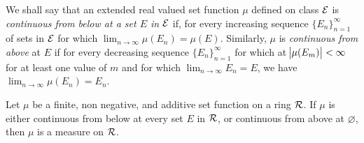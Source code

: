 We shall say that an extended real valued set function $\mu$ defined on 
class $\mathcal{E}$ is \emph{continuous from below at a set $E$ in $\mathcal{E}$} if, for 
every increasing sequence $\{E_n\}_{n=1}^\infty$ of sets in $\mathcal{E}$ for which 
$\lim_{n \to \infty} \mu(E_n) = \mu(E)$. 
Similarly, $\mu$ is \emph{continuous from above} at $E$ if for every 
decreasing sequence $\{E_n\}_{n=1}^\infty$ for which at $\abs{\mu(E_m)} < 
\infty$ for at least one value of $m$ and for which $\lim_{n \to \infty} 
E_n = E$, we have $\lim_{n \to \infty} \mu(E_n) = E_n$. 

\begin{thm}
Let $\mu$ be a finite, non negative, and additive set function on a ring 
$\mathcal{R}$. 
If $\mu$ is either continuous from below at every set $E$ in $\mathcal{R}$, or 
continuous from above at $\varnothing$, then $\mu$ is a measure on $\mathcal{R}$. 
\end{thm}